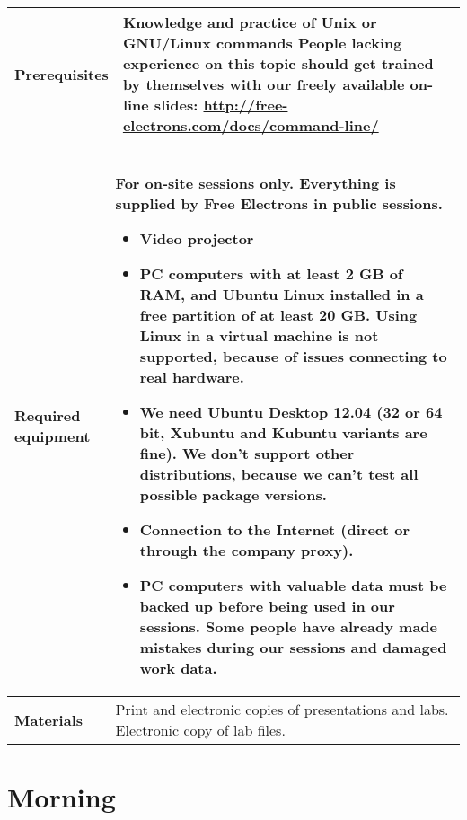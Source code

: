\documentclass[a4paper,12pt,obeyspaces,spaces,hyphens]{article}
\begin{document}
{\begin{tabularx}{\textwidth}{|g|h|}
    {\bf Prerequisites} & {\bf Knowledge and practice of Unix or
      GNU/Linux commands}
    \newline People lacking experience on this topic should get
    trained by themselves with our freely available on-line slides:
    \newline \url{http://free-electrons.com/docs/command-line/} \vspace{1em}
     \\
    \hline
  \end{tabularx}

  \begin{tabularx}{\textwidth}{|g|h|}
    {\bf Required equipment} &
    {\bf For on-site sessions only.}
    \newline Everything is supplied by Free Electrons in public sessions.
    \begin{itemize}
    \item Video projector
    \item PC computers with at least 2 GB of RAM, and Ubuntu Linux
    installed in a {\bf free partition of at least 20 GB. Using Linux
      in a virtual machine is not supported}, because of issues
    connecting to real hardware.
    \item We need Ubuntu Desktop 12.04 (32 or 64 bit, Xubuntu and
    Kubuntu variants are fine). We don't support other
    distributions, because we can't test all possible package versions.
    \item {\bf Connection to the Internet} (direct or through the
    company proxy).
    \item {\bf PC computers with valuable data must be backed up}
    before being used in our sessions.  Some people have already made
    mistakes during our sessions and damaged work data.
    \end{itemize}\\
    \hline

    {\bf Materials} & Print and electronic copies of presentations and
    labs.
    \newline Electronic copy of lab files.\\
    \hline

\end{tabularx}}
\normalsize


\section{Morning}
\end{document}
